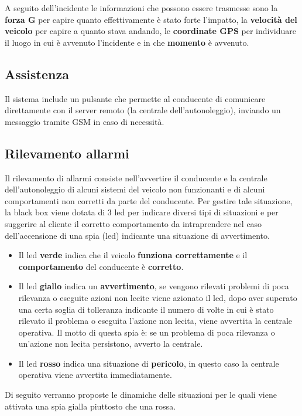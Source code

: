 \documentclass[12pt, a4paper, italian]{report}
\numberwithin{figure}{chapter}
\numberwithin{table}{chapter}
\begin{document}
A seguito dell'incidente le informazioni che possono essere trasmesse sono la \textbf{forza G} per capire quanto effettivamente è stato forte l'impatto, la \textbf{velocità del veicolo} per capire a quanto stava andando, le \textbf{coordinate GPS} per individuare il luogo in cui è avvenuto l'incidente e in che \textbf{momento} è avvenuto.

\subsection{Assistenza}
Il sistema include un pulsante che permette al conducente di comunicare direttamente con il server remoto (la centrale dell'autonoleggio), inviando un messaggio tramite GSM in caso di necessità.
\subsection{Rilevamento allarmi}
Il rilevamento di allarmi consiste nell'avvertire il conducente e la centrale dell'autonoleggio di alcuni sistemi del veicolo non funzionanti e di alcuni comportamenti non corretti da parte del conducente. Per gestire tale situazione, la black box viene dotata di 3 led per indicare diversi tipi di situazioni e per suggerire al cliente il corretto comportamento da intraprendere nel caso dell'accensione di una spia (led) indicante una situazione di avvertimento. 
\begin{itemize}
    \item Il led \textbf{verde} indica che il veicolo \textbf{funziona correttamente} e il \textbf{comportamento} del conducente è \textbf{corretto}.
    \item Il led \textbf{giallo} indica un \textbf{avvertimento}, se vengono rilevati problemi di poca rilevanza o eseguite azioni non lecite viene azionato il led, dopo aver superato una certa soglia di tolleranza indicante il numero di volte in cui è stato rilevato il problema o eseguita l'azione non lecita, viene avvertita la centrale operativa. Il motto di questa spia è: se un problema di poca rilevanza o un'azione non lecita persistono, avverto la centrale.
    \item Il led \textbf{rosso} indica una situazione di \textbf{pericolo}, in questo caso la centrale operativa viene avvertita immediatamente.
\end{itemize}

Di seguito verranno proposte le dinamiche delle situazioni per le quali viene attivata una spia gialla piuttosto che una rossa.
\end{document}
